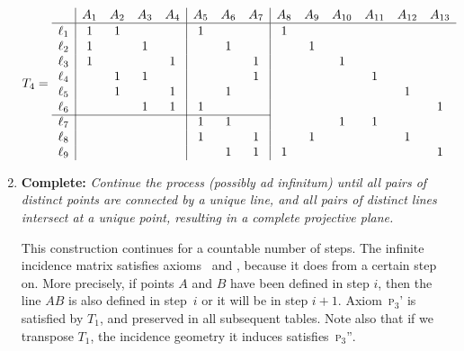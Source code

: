 \begin{xmpl}
\begin{enumerate}[1.]
        \vspace{-2\parskip}
        \small
        \setlength{\arraycolsep}{3pt}
        \begin{align}\label{eq:T4}
            T_4=\begin{array}{l|cccc|ccc|cccccc}
                &A_1 &A_2 &A_3 &A_4 &A_5 &A_6 &A_7
                &A_8 &A_9 &A_{10} &A_{11} &A_{12} &A_{13}\\
                \hline\rule{0pt}{9pt}
                \ell_1 &1&1&&&1&&&1&&&&&\\
                \ell_2 &1 &&1 &&&1&&&1&&&&\\
                \ell_3 &1 &&&1 &&&1&&&1&&&\\
                \ell_4 &&1 &1 &&&&1&&&&1&&\\
                \ell_5 &&1 &&1 &&1&&&&&&1&\\
                \ell_6 &&&1 &1 &1&&&&&&&&1\\
                \cline{1-8}
                \ell_7 &&&&&1 &1&&&&1&1&&\\
                \ell_8 &&&&&1&&1&&1&&&1&\\
                \ell_9 &&&&&&1&1&1&&&&&1
            \end{array}
        \end{align}
        
        \normalsize

        \item \textbf{Complete:} \textit{Continue the process (possibly \textsl{ad infinitum}) until all pairs of distinct points are connected by a unique line, and all pairs of distinct lines intersect at a unique point, resulting in a complete projective plane.}

        This construction continues for a countable number of steps. The infinite incidence matrix satisfies axioms~ and , because it does from a certain step on. More precisely, if points $A$ and $B$ have been defined in step $i$, then the line $AB$ is also defined in step~$i$ or it will be in step $i+1$. Axiom~\textsc{p$_3$\!'} is satisfied by \hyperref[eq:T1]{$T_1$}, and preserved in all subsequent tables. Note also that if we transpose \hyperref[eq:T1]{$T_1$}, the incidence geometry it induces satisfies~\textsc{p$_3$\!''}.
    \end{enumerate}
\end{xmpl}


